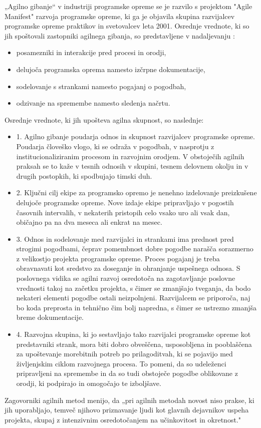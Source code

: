 \documentclass[a4paper,12pt,openright]{book}
\begin{document}
„Agilno gibanje“ v industriji programske opreme se je razvilo s projektom "Agile Manifest" razvoja programske opreme, ki ga je objavila skupina razvijalcev programske opreme praktikov in svetovalcev leta 2001. Osrednje vrednote, ki so jih spoštovali zastopniki agilnega gibanja, so predstavljene v nadaljevanju \cite{highsmith2009agile}:
\begin{itemize}
    \item posamezniki in interakcije pred procesi in orodji,
    \item delujoča programska oprema namesto izčrpne dokumentacije,
    \item sodelovanje s strankami namesto pogajanj o pogodbah,
    \item odzivanje na spremembe namesto sledenja načrtu.
\end{itemize}
Osrednje vrednote, ki jih upošteva agilna skupnost, so naslednje:
\begin{itemize}
    \item 1. Agilno gibanje poudarja odnos in skupnost razvijalcev programske opreme. Poudarja človeško vlogo, ki se odraža v pogodbah, v nasprotju z institucionaliziranim procesom in razvojnim orodjem. V obstoječih agilnih praksah se to kaže v tesnih odnosih v skupini, tesnem delovnem okolju in v drugih postopkih, ki spodbujajo timski duh.
    \item 2. Ključni cilj ekipe za programsko opremo je nenehno izdelovanje preizkušene delujoče programske opreme. Nove izdaje ekipe pripravljajo v pogostih časovnih intervalih, v nekaterih pristopih celo vsako uro ali vsak dan, običajno pa na dva meseca ali enkrat na mesec. 
    \item 3. Odnos in sodelovanje med razvijalci in strankami ima prednost pred strogimi pogodbami, čeprav pomembnost dobre pogodbe narašča sorazmerno z velikostjo projekta programske opreme.
    Proces pogajanj je treba obravnavati kot sredstvo za doseganje in ohranjanje uspešnega odnosa. S poslovnega vidika se agilni razvoj osredotoča na zagotavljanje poslovne vrednosti takoj na začetku projekta, s čimer se zmanjšajo tveganja, da bodo nekateri elementi pogodbe ostali neizpolnjeni. Razvijalcem se priporoča, naj bo koda preprosta in tehnično čim bolj napredna, s čimer se ustrezno zmanjša breme dokumentacije.
    \item 4. Razvojna skupina, ki jo sestavljajo tako razvijalci programske opreme kot predstavniki strank, mora biti dobro obveščena, usposobljena in pooblaščena za upoštevanje morebitnih potreb po prilagoditvah, ki se pojavijo med življenjskim ciklom razvojnega procesa. To pomeni, da so udeleženci pripravljeni na spremembe in da so tudi obstoječe pogodbe oblikovane z orodji, ki podpirajo in omogočajo te izboljšave.
\end{itemize}
Zagovorniki agilnih metod menijo, da „pri agilnih metodah novost niso prakse, ki jih uporabljajo, temveč njihovo priznavanje ljudi kot glavnih dejavnikov uspeha projekta, skupaj z intenzivnim osredotočanjem na učinkovitost in okretnost." 
\cite{DBLP:journals/corr/abs-1709-08439}
\end{document}
